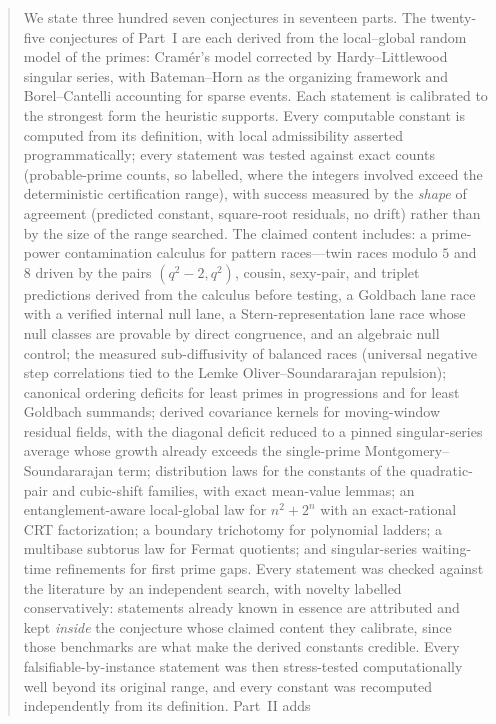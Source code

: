 \documentclass[11pt]{article}
\theoremstyle{definition}
\begin{document}
\begin{abstract}
We state three hundred seven conjectures in seventeen parts.  The twenty-five conjectures of Part~I are each derived from the
local--global random model of the primes:
Cram\'er's model corrected by Hardy--Littlewood singular series, with
Bateman--Horn as the organizing framework and Borel--Cantelli accounting
for sparse events.  Each statement is calibrated to the strongest form the
heuristic supports.  Every computable constant is
computed from its definition, with local admissibility asserted
programmatically; every statement was tested against exact counts
(probable-prime counts, so labelled, where the integers involved
exceed the deterministic certification range), with
success measured by the \emph{shape} of agreement (predicted constant,
square-root residuals, no drift) rather than by the size of the range
searched.  The claimed content includes: a prime-power contamination
calculus for pattern races---twin races modulo $5$ and $8$ driven by the
pairs $(q^2-2,q^2)$, cousin, sexy-pair, and triplet predictions derived
from the calculus before testing, a Goldbach lane race with a verified
internal null lane, a Stern-representation lane race whose null classes
are provable by direct congruence, and an algebraic null control; the
measured sub-diffusivity of balanced races (universal negative step
correlations tied to the Lemke Oliver--Soundararajan repulsion);
canonical ordering deficits for least primes in progressions and for
least Goldbach summands; derived covariance kernels for moving-window
residual fields, with the diagonal deficit reduced to a pinned
singular-series average whose growth already exceeds the single-prime
Montgomery--Soundararajan term; distribution laws for the constants of
the quadratic-pair and cubic-shift families, with exact mean-value
lemmas; an entanglement-aware local-global law for $n^2+2^n$ with an
exact-rational CRT factorization; a boundary trichotomy for polynomial
ladders; a multibase subtorus law for Fermat quotients; and
singular-series waiting-time refinements for first prime gaps.  Every
statement was checked against the literature by an independent search,
with novelty labelled conservatively: statements already known in
essence are attributed and kept \emph{inside} the conjecture whose claimed
content they calibrate, since those benchmarks are what make the derived
constants credible.  Every falsifiable-by-instance statement was then
stress-tested computationally well beyond its original range, and every
constant was recomputed independently from its definition.  Part~II adds

\end{abstract}
\end{document}
